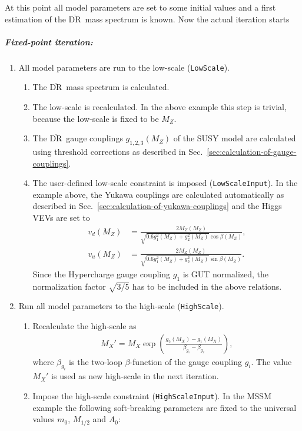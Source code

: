 \documentclass[final,3p,11pt,pdflatex]{elsarticle}
\newcommand{\code}[1]{\lstinline|#1|}  %
\newcommand{\textoverline}[1]{$\overline{\mbox{#1}}$}
\newcommand{\DRbar}{\textoverline{DR}\xspace}
\newcommand{\secref}[1]{Sec.~\ref{#1}}
\begin{document}
%
At this point all model parameters are set to some initial values and
a first estimation of the \DRbar\ mass spectrum is known.  Now the
actual iteration starts
%
\subparagraph{Fixed-point iteration:}
%
\begin{enumerate}
\item \label{rge-step-one} All model parameters are run to the
  low-scale (\code{LowScale}).
  \begin{enumerate}
  \item The \DRbar\ mass spectrum is calculated.
  \item The low-scale is recalculated.  In the above example this step
    is trivial, because the low-scale is fixed to be $M_Z$.
  \item The \DRbar\ gauge couplings $g_{1,2,3}(M_Z)$ of the SUSY model
    are calculated using threshold corrections as described in
    \secref{sec:calculation-of-gauge-couplings}.
  \item The user-defined low-scale constraint is imposed
    (\code{LowScaleInput}).  In the example above, the Yukawa
    couplings are calculated automatically as described in
    \secref{sec:calculation-of-yukawa-couplings} and the Higgs VEVs
    are set to
    \begin{align}
      v_d(M_Z) &= \frac{2 M_Z(M_Z)}{\sqrt{0.6 g_1^2(M_Z) + g_2^2(M_Z)} \cos\beta(M_Z)}, \\
      v_u(M_Z) &= \frac{2 M_Z(M_Z)}{\sqrt{0.6 g_1^2(M_Z) + g_2^2(M_Z)} \sin\beta(M_Z)}.
    \end{align}
    Since the Hypercharge gauge coupling $g_1$ is GUT normalized, the
    normalization factor $\sqrt{3/5}$ has to be included in the above
    relations.
  \end{enumerate}
\item Run all model parameters to the high-scale (\code{HighScale}).
  \begin{enumerate}
  \item Recalculate the high-scale as
    \begin{align}
      M_X' = M_X \exp\left(\frac{g_2(M_X)-g_1(M_X)}{\beta_{g_1} -
          \beta_{g_2}}\right),
    \end{align}
    where $\beta_{g_i}$ is the two-loop $\beta$-function of the gauge
    coupling $g_i$.  The value $M_X'$ is used as new high-scale in the
    next iteration.
  \item Impose the high-scale constraint (\code{HighScaleInput}).  In
    the MSSM example the following soft-breaking parameters are fixed
    to the universal values $m_0$, $M_{1/2}$ and $A_0$:

\end{enumerate}
\end{enumerate}
\end{document}
